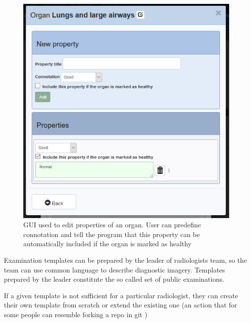 \documentclass[12pt, twoside, openany]{report}
\theoremstyle{definition}
\begin{document}
\begin{figure}
    \centering
    \includegraphics{template-property-list.PNG}
    \caption{GUI used to edit properties of an organ. User can predefine connotation and tell the program that this property can be automatically included if the organ is marked as healthy \label{fig:template-property-list}}
\end{figure}

Examination templates can be prepared by the leader of radiologists team, so the team can use common language to describe diagnostic imagery. Templates prepared by the leader constitute the so called set of public examinations.

If a given template is not sufficient for a particular radiologist, they can  create their own template from scratch or extend the existing one (an action that for some people can resemble forking a repo in git \cite{forking})
\end{document}

